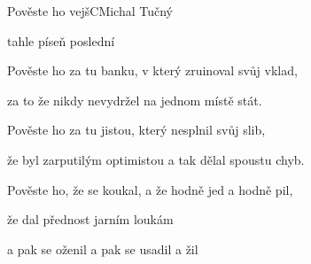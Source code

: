 \begin{song}{Pověste ho vejš}{C}{Michal Tučný}
\begin{SBChorus}
tahle  píseň poslední
\end{SBChorus}

\begin{SBVerse}

Pověste ho za tu banku, v který zruinoval svůj vklad,

za to že nikdy nevydržel na jednom místě stát.

\end{SBVerse}

\begin{SBChorus}

\end{SBChorus}

\begin{SBVerse}

Pověste ho za tu jistou, který nesplnil svůj slib,

že byl zarputilým optimistou a tak dělal spoustu chyb.

\end{SBVerse}

\begin{SBVerse}

Pověste ho, že se koukal, a že hodně jed a hodně pil,

že dal přednost jarním loukám

a pak se oženil a pak se usadil a žil

\end{SBVerse}

\begin{SBChorus}

\end{SBChorus}

\end{song}

\clearpage
